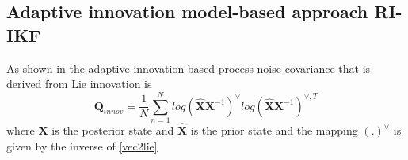 \documentclass[conference]{IEEEtran}
\begin{document}
\subsection{Adaptive innovation model-based approach RI-IKF}

As shown in \cite{diker2026neural} the adaptive innovation-based process noise covariance that is derived from Lie innovation is
\begin{equation}
  \label{innov_RI-ikf}
\mathbf Q_{innov} = \frac{1}{N}\sum_{n=1}^N log(\hat{\mathbf X}\mathbf X^{-1})^{\vee} log(\hat{\mathbf X}\mathbf X^{-1})^{\vee,T} 
\end{equation}
where \(\mathbf X\) is the posterior state and \(\hat{\mathbf X}\) is the prior state and the mapping \((.)^{\vee}\) is given by the inverse of \eqref{vec2lie}

\end{document}
